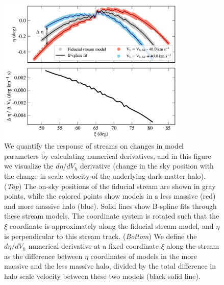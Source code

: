 \documentclass[modern]{aastex61}
\begin{document}
\begin{figure}
\begin{center}
\includegraphics[width=0.8\textwidth]{derivative_vis.pdf}
\caption{We quantify the response of streams on changes in model parameters by calculating numerical derivatives, and in this figure we visualize the $d\eta / d V_h$ derivative (change in the sky position with the change in scale velocity of the underlying dark matter halo).
(\emph{Top}) The on-sky positions of the fiducial stream are shown in gray points, while the colored points show models in a less massive (red) and more massive halo (blue).
Solid lines show B-spline fits through these stream models.
The coordinate system is rotated such that the $\xi$ coordinate is approximately along the fiducial stream model, and $\eta$ is perpendicular to this stream track. 
(\emph{Bottom}) We define the $d\eta / d V_h$ numerical derivative at a fixed coordinate $\xi$ along the stream as the difference between $\eta$ coordinates of models in the more massive and the less massive halo, divided by the total difference in halo scale velocity between these two models (black solid line). 
}
\label{fig:derivative_steps}
\end{center}
\end{figure}
\end{document}
